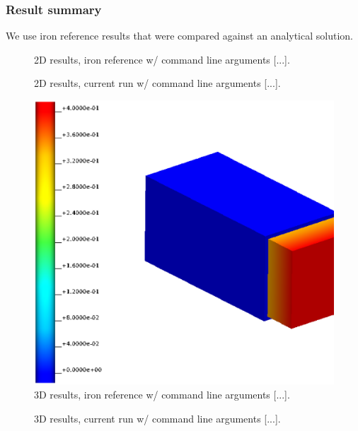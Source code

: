 \subsubsection{Result summary}
%
We use iron reference results that were compared against an analytical solution.
%


%
\begin{figure}[h!]
    \centering
    \caption{2D results, iron reference w/ command line arguments [...].}
    \label{example-0201-u-iron-2D-reference-fig}
\end{figure}
%
\begin{figure}[h!]
    \centering 
    \caption{2D results, current run w/ command line arguments [...].}
    \label{example-0201-u-current-run-2D-fig}
\end{figure}
%
\begin{figure}[h!]
    \centering 
    \includegraphics[width=0.9\columnwidth]{examples/example-0201-u/doc/figures/iron_reference_3D.eps} 
    \caption{3D results, iron reference w/ command line arguments [...].}
    \label{example-0201-u-iron-3D-reference-fig}
\end{figure}
%
\begin{figure}[h!]
    \centering 
    \caption{3D results, current run w/ command line arguments [...].}
    \label{example-0201-u-current-run-3D-fig}
\end{figure}
%
